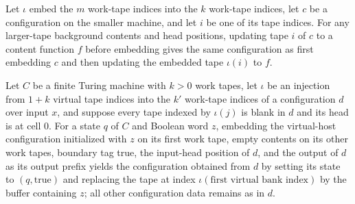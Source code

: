 \begin{theorem}
\label{Turing.oracleEmbed_updateTape}
\leanok
{}
Let $\iota$ embed the $m$ work-tape indices into the $k$ work-tape indices, let $c$ be a
configuration on the smaller machine, and let $i$ be one of its tape indices. For any
larger-tape background contents and head positions, updating tape $i$ of $c$ to a
content function $f$ before embedding gives the same configuration as first embedding
$c$ and then updating the embedded tape $\iota(i)$ to $f$.
\end{theorem}

\begin{theorem}
\label{Turing.oracleCall_view}
\leanok
{}
Let $C$ be a finite Turing machine with $k>0$ work tapes, let $\iota$ be an injection
from $1+k$ virtual tape indices into the $k'$ work-tape indices of a configuration $d$
over input $x$, and suppose every tape indexed by $\iota(j)$ is blank in $d$ and its
head is at cell $0$. For a state $q$ of $C$ and Boolean word $z$, embedding the
virtual-host configuration initialized with $z$ on its first work tape, empty contents
on its other work tapes, boundary tag true, the input-head position of $d$, and the
output of $d$ as its output prefix yields the configuration obtained from $d$ by setting
its state to $(q,\mathrm{true})$ and replacing the tape at index $\iota(\text{first
virtual bank index})$ by the buffer containing $z$; all other configuration data remains
as in $d$.
\end{theorem}

